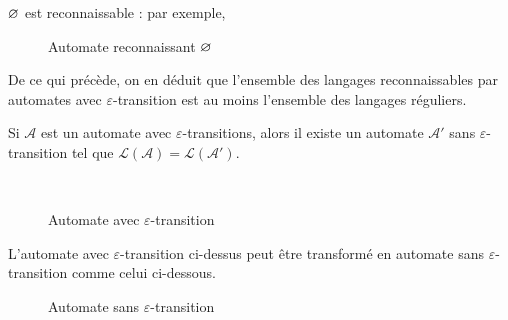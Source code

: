 \begin{rmk}
	$\varnothing$\/ est reconnaissable : par exemple, 
	\begin{figure}[H]
		\centering
		\caption{Automate reconnaissant $\varnothing$}
	\end{figure}
\end{rmk}

\begin{prop}
	De ce qui précède, on en déduit que l'ensemble des langages reconnaissables par automates avec $\varepsilon$-transition est au moins l'ensemble des langages réguliers.
\end{prop}

\begin{thm}
	Si $\mathcal{A}$\/ est un automate avec $\varepsilon$-transitions, alors il existe un automate $\mathcal{A}'$\/ sans $\varepsilon$-transition tel que $\mathcal{L}(\mathcal{A}) = \mathcal{L}(\mathcal{A}')$.
\end{thm}

\begin{exm}~
	\begin{figure}[H]
		\centering
		\caption{Automate avec $\varepsilon$-transition}
	\end{figure}
	L'automate avec $\varepsilon$-transition ci-dessus peut être transformé en automate sans $\varepsilon$-transition comme celui ci-dessous.
	\begin{figure}[H]
		\centering
		\caption{Automate sans $\varepsilon$-transition}
	\end{figure}
\end{exm}

